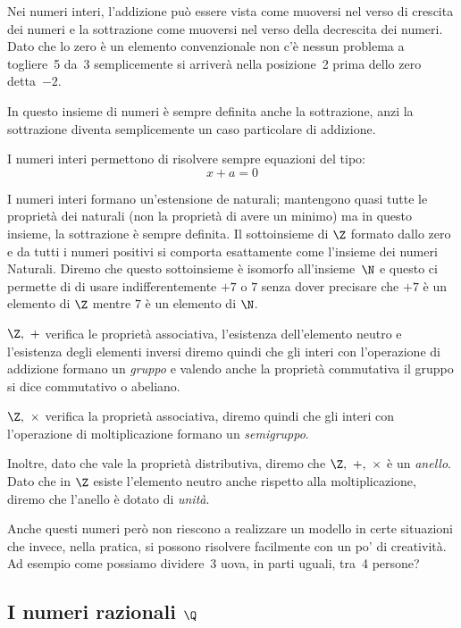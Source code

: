 Nei numeri interi, l'addizione può essere vista come muoversi nel verso 
di crescita dei numeri e la sottrazione come muoversi nel verso della 
decrescita dei numeri. Dato che lo zero è un elemento convenzionale non c'è 
nessun problema a togliere~5 da~3 semplicemente si arriverà nella 
posizione~2 prima dello zero detta~\(-2\).

In questo insieme di numeri è sempre definita anche la sottrazione, anzi la 
sottrazione diventa semplicemente un caso particolare di addizione.

I numeri interi permettono di risolvere sempre equazioni del tipo:
\[x+a=0\]

I numeri interi formano un'estensione de naturali;
mantengono quasi tutte le proprietà dei naturali 
(non la proprietà di avere un minimo) ma in questo insieme, la sottrazione è 
sempre definita.
Il sottoinsieme di \(\Z\) formato dallo zero e da tutti i numeri positivi
si comporta esattamente come l'insieme dei numeri Naturali. Diremo che 
questo sottoinsieme è isomorfo all'insieme~\(\N\) 
e questo ci permette di di usare indifferentemente \(+7\) o \(7\) 
senza dover precisare che \(+7\) è un elemento di \(\Z\) 
mentre \(7\) è un elemento di \(\N\).

\(\Z,~+\) verifica le proprietà associativa, l'esistenza dell'elemento 
neutro e l'esistenza degli elementi inversi diremo quindi che gli interi 
con l'operazione di addizione formano un \emph{gruppo} e valendo anche 
la proprietà commutativa il gruppo si dice commutativo o abeliano.

\(\Z,~\times\) verifica la proprietà associativa, diremo quindi che gli 
interi con l'operazione di moltiplicazione formano un \emph{semigruppo}.

Inoltre, dato che vale la proprietà distributiva, diremo che 
\(\Z,~+,~\times\) è un \emph{anello}. Dato che in \(\Z\) esiste l'elemento 
neutro anche rispetto alla moltiplicazione, diremo che l'anello è dotato di 
\emph{unità}.

Anche questi numeri però non riescono a realizzare un modello in certe 
situazioni che invece, nella pratica, si possono risolvere facilmente con un 
po' di creatività. Ad esempio come possiamo dividere~3 uova, in parti 
uguali, tra~4 persone?

\subsection{I numeri razionali \(\Q\)}
\label{subsec:insnum_razionali}

